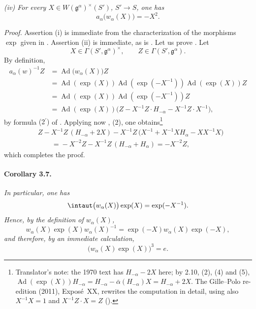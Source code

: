 \smallskip
\noindent\emph{\textup{(iv)} For every
\(X\in W(\mathfrak g^\alpha)^\times(S')\), \(S'\to S\), one has}
\[
  a_\alpha\bigl(w_\alpha(X)\bigr)=-X^2.
\]

\smallskip
\noindent\emph{Proof.}
Assertion \textup{(i)} is immediate from the characterization of the
morphisms \(\exp\) given in .  Assertion \textup{(ii)} is
immediate, as is \textup{}.  Let us prove \textup{}.  Let
\[
  X\in\Gamma(S',\mathfrak g^\alpha)^\times,
  \qquad
  Z\in\Gamma(S',\mathfrak g^\alpha).
\]
By definition,
\[
\begin{aligned}
  a_\alpha(w)^{-1}Z
    &={}\operatorname{Ad}\bigl(w_\alpha(X)\bigr)Z\\
    &={}\operatorname{Ad}(\exp(X))
       \operatorname{Ad}(\exp(-X^{-1}))
       \operatorname{Ad}(\exp(X))Z\\
    &={}\operatorname{Ad}(\exp(X))
       \operatorname{Ad}(\exp(-X^{-1}))Z\\
    &={}\operatorname{Ad}(\exp(X))
       \bigl(Z-X^{-1}Z\cdot H_{-\alpha}-X^{-1}Z\cdot X^{-1}\bigr),
\end{aligned}
\]
by formula \textup{(2\(^{\prime}\))} of . Applying now
, \textup{(2)}, one obtains\footnote{Translator's note: the 1970
text has \(H_{-\alpha}-2X\) here; by 2.10, (2), (4) and (5),
\(\operatorname{Ad}(\exp(X))H_{-\alpha}=H_{-\alpha}-\bar\alpha(H_{-\alpha})X=H_{-\alpha}+2X\). The
Gille--Polo re-edition (2011), Exposé~XX, rewrites the computation in detail, using also
\(X^{-1}X=1\) and \(X^{-1}Z\cdot X=Z\) \textup{()}.}
\[
\begin{aligned}
  &Z-X^{-1}Z\,(H_{-\alpha}+2X)
     -X^{-1}Z\,\bigl(X^{-1}+X^{-1}XH_\alpha-XX^{-1}X\bigr)\\
  &\qquad={}-X^{-2}Z-X^{-1}Z\,(H_{-\alpha}+H_\alpha)
   =-X^{-2}Z,
\end{aligned}
\]
which completes the proof.

\paragraph{\textbf{Corollary 3.7.}}
\emph{In particular, one has}
\[
  \intaut\bigl(w_\alpha(X)\bigr)\exp(X)=\exp(-X^{-1}).
\]
\emph{Hence, by the definition of \(w_\alpha(X)\),}
\[
  w_\alpha(X)\exp(X)w_\alpha(X)^{-1}
    =\exp(-X)w_\alpha(X)\exp(-X),
\]
\emph{and therefore, by an immediate calculation,}
\[
  \bigl(w_\alpha(X)\exp(X)\bigr)^3=e.
\]


